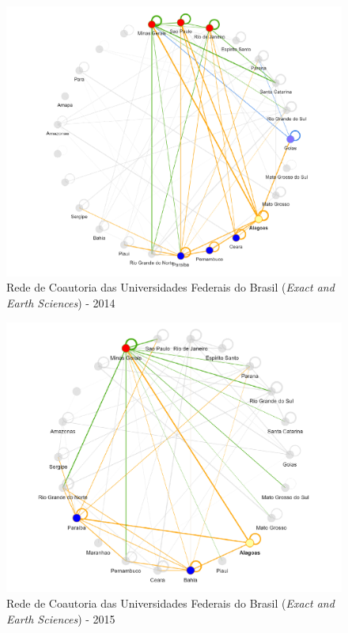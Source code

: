 \begin{figure}[H]
	\centering
	\includegraphics[width=\linewidth]{Imagens/rede-exact-AL-2014.pdf}
	\caption{Rede de Coautoria das Universidades Federais do Brasil (\textit{Exact and Earth Sciences}) - 2014}
	\label{Rede de Coautoria - UF EXACT AL 2014}
\end{figure}


\begin{figure}[H]
	\centering
	\includegraphics[width=\linewidth]{Imagens/rede-exact-AL-2015.pdf}
	\caption{Rede de Coautoria das Universidades Federais do Brasil (\textit{Exact and Earth Sciences}) - 2015}
	\label{Rede de Coautoria - UF EXACT AL 2015}
\end{figure}

